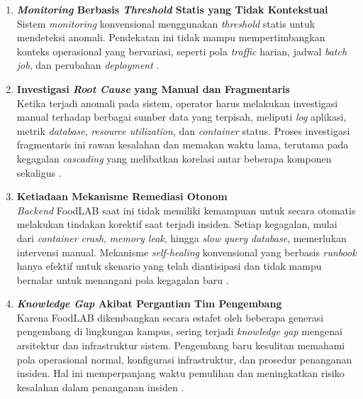 \begin{enumerate}[label=\arabic*., leftmargin=*]
  \item \textbf{\textit{Monitoring} Berbasis \textit{Threshold} Statis yang Tidak Kontekstual}\\
  Sistem \textit{monitoring} konvensional menggunakan \textit{threshold} statis untuk mendeteksi anomali. Pendekatan ini tidak mampu mempertimbangkan konteks operasional yang bervariasi, seperti pola \textit{traffic} harian, jadwal \textit{batch job}, dan perubahan \textit{deployment} \cite{voutsas2024mitigating}.

  \item \textbf{Investigasi \textit{Root Cause} yang Manual dan Fragmentaris}\\
  Ketika terjadi anomali pada sistem, operator harus melakukan investigasi manual terhadap berbagai sumber data yang terpisah, meliputi \textit{log} aplikasi, metrik \textit{database}, \textit{resource utilization}, dan \textit{container} status. Proses investigasi fragmentaris ini rawan kesalahan dan memakan waktu lama, terutama pada kegagalan \textit{cascading} yang melibatkan korelasi antar beberapa komponen sekaligus \cite{trinity2023}.

  \item \textbf{Ketiadaan Mekanisme Remediasi Otonom}\\
  \textit{Backend} FoodLAB saat ini tidak memiliki kemampuan untuk secara otomatis melakukan tindakan korektif saat terjadi insiden. Setiap kegagalan, mulai dari \textit{container} \textit{crash}, \textit{memory leak}, hingga \textit{slow query} \textit{database}, memerlukan intervensi manual. Mekanisme \textit{self-healing} konvensional yang berbasis \textit{runbook} hanya efektif untuk skenario yang telah diantisipasi dan tidak mampu bernalar untuk menangani pola kegagalan baru \cite{liang2023self}.

  \item \textbf{\textit{Knowledge Gap} Akibat Pergantian Tim Pengembang}\\
  Karena FoodLAB dikembangkan secara estafet oleh beberapa generasi pengembang di lingkungan kampus, sering terjadi \textit{knowledge gap} mengenai arsitektur dan infrastruktur sistem. Pengembang baru kesulitan memahami pola operasional normal, konfigurasi infrastruktur, dan prosedur penanganan insiden. Hal ini memperpanjang waktu pemulihan dan meningkatkan risiko kesalahan dalam penanganan insiden \cite{yulanda2025refactoring}.
\end{enumerate}

